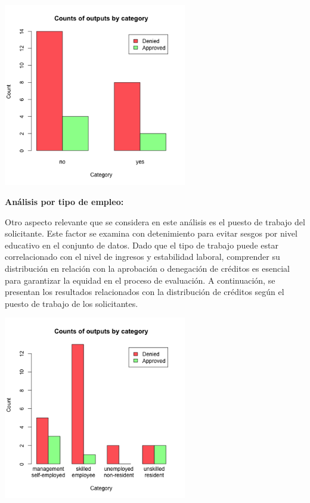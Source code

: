 \documentclass{article}
\begin{document}
\begin{multicols}{2}
\begin{center} %
    \includegraphics[width=8cm]{tex/media/foreign.png} 
\end{center}

\vspace{0.5cm}
\textbf{Análisis por tipo de empleo:}

Otro aspecto relevante que se considera en este análisis es el puesto de trabajo del solicitante. Este factor se examina con detenimiento para evitar sesgos por nivel educativo en el conjunto de datos. Dado que el tipo de trabajo puede estar correlacionado con el nivel de ingresos y estabilidad laboral, comprender su distribución en relación con la aprobación o denegación de créditos es esencial para garantizar la equidad en el proceso de evaluación. A continuación, se presentan los resultados relacionados con la distribución de créditos según el puesto de trabajo de los solicitantes.


\begin{center} %
    \includegraphics[width=8cm]{tex/media/jobs.png} 
\end{center}


\end{multicols}
\end{document}
